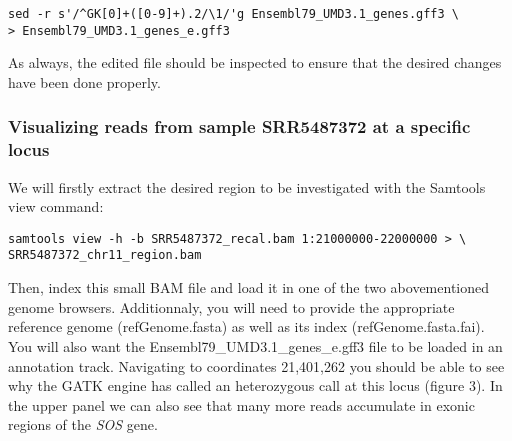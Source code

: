 \begin{verbatim}
sed -r s'/^GK[0]+([0-9]+).2/\1/'g Ensembl79_UMD3.1_genes.gff3 \
> Ensembl79_UMD3.1_genes_e.gff3
\end{verbatim}

As always, the edited file should be inspected to ensure that the desired changes have been done properly.


\subsubsection{Visualizing reads from sample SRR5487372 at a specific locus}



We will firstly extract the desired region to be investigated with the Samtools view command:

\begin{verbatim}
samtools view -h -b SRR5487372_recal.bam 1:21000000-22000000 > \
SRR5487372_chr11_region.bam
\end{verbatim}


Then, index this small BAM file and load it in one of the two abovementioned genome browsers. Additionnaly, you will need to provide the appropriate reference genome (refGenome.fasta) as well as its index (refGenome.fasta.fai). You will also want the Ensembl79\_UMD3.1\_genes\_e.gff3 file to be loaded in an annotation track. Navigating to coordinates 21,401,262 you should be able to see why the GATK engine has called an heterozygous call at this locus (figure 3). In the upper panel we can also see that many more reads accumulate in exonic regions of the \textit{SOS} gene.







